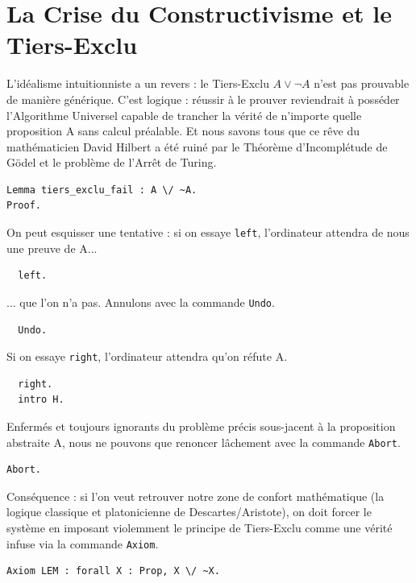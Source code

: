 \documentclass[11pt,a4paper]{article}
\begin{document}
\section{La Crise du Constructivisme et le Tiers-Exclu}

L'idéalisme intuitionniste a un revers : le Tiers-Exclu $A \lor \neg A$ n'est pas prouvable de manière générique. C'est logique : réussir à le prouver reviendrait à posséder l'Algorithme Universel capable de trancher la vérité de n'importe quelle proposition A sans calcul préalable. Et nous savons tous que ce rêve du mathématicien David Hilbert a été ruiné par le Théorème d'Incomplétude de Gödel et le problème de l'Arrêt de Turing.

\begin{lstlisting}
Lemma tiers_exclu_fail : A \/ ~A.
Proof.
\end{lstlisting}

On peut esquisser une tentative : si on essaye \texttt{left}, l'ordinateur attendra de nous une preuve de A...

\begin{lstlisting}
  left.
\end{lstlisting}

... que l'on n'a pas. Annulons avec la commande \texttt{Undo}.

\begin{lstlisting}
  Undo.
\end{lstlisting}

Si on essaye \texttt{right}, l'ordinateur attendra qu'on réfute A.

\begin{lstlisting}
  right.
  intro H.
\end{lstlisting}

Enfermés et toujours ignorants du problème précis sous-jacent à la proposition abstraite A, nous ne pouvons que renoncer lâchement avec la commande \texttt{Abort}.

\begin{lstlisting}
Abort.
\end{lstlisting}

Conséquence : si l'on veut retrouver notre zone de confort mathématique (la logique classique et platonicienne de Descartes/Aristote), on doit forcer le système en imposant violemment le principe de Tiers-Exclu comme une vérité infuse via la commande \texttt{Axiom}.

\begin{lstlisting}
Axiom LEM : forall X : Prop, X \/ ~X.
\end{lstlisting}
\end{document}
